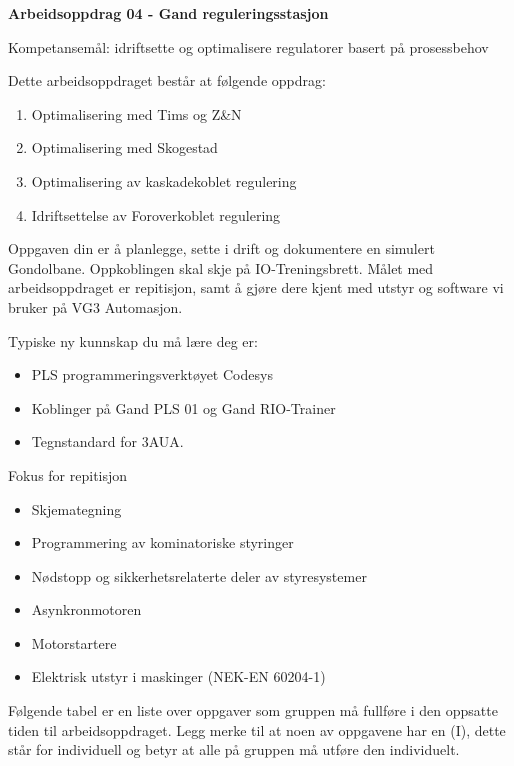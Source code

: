 
\noindent
{\bf Arbeidsoppdrag 04 - Gand reguleringsstasjon}

\vskip 5pt
Kompetansemål:
idriftsette og optimalisere regulatorer basert på prosessbehov

Dette arbeidsoppdraget består at følgende oppdrag:
\begin{enumerate}
	\item Optimalisering med Tims og Z\&N 
	\item Optimalisering med Skogestad
	\item Optimalisering av kaskadekoblet regulering
	\item Idriftsettelse av Foroverkoblet regulering
\end{enumerate}

Oppgaven din er å planlegge, sette i drift og dokumentere en simulert Gondolbane. Oppkoblingen skal skje på IO-Treningsbrett. Målet med arbeidsoppdraget er repitisjon, samt å gjøre dere kjent med utstyr og software vi bruker på VG3 Automasjon. 

\vskip 5pt

Typiske ny kunnskap du må lære deg er:
\begin{itemize}[noitemsep]
	\item PLS programmeringsverktøyet Codesys
	\item Koblinger på Gand PLS 01 og Gand RIO-Trainer
	\item Tegnstandard for 3AUA. 
\end{itemize}

Fokus for repitisjon
\begin{itemize}[noitemsep]
	\item Skjemategning
	\item Programmering av kominatoriske styringer
	\item Nødstopp og sikkerhetsrelaterte deler av styresystemer
	\item Asynkronmotoren
	\item Motorstartere
	\item Elektrisk utstyr i maskinger (NEK-EN 60204-1)
\end{itemize}

\vskip 5pt
Følgende tabel er en liste over oppgaver som gruppen må fullføre i den oppsatte tiden til arbeidsoppdraget. Legg merke til at noen av oppgavene har en (I), dette står for individuell og betyr at alle på gruppen må utføre den individuelt.

\vskip 5pt

